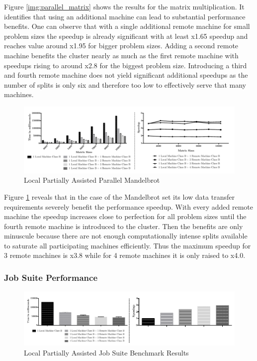 Figure \ref{img:parallel_matrix} shows the results for the matrix multiplication. It identifies that using an additional machine can lead to substantial performance benefits. One can observe that with a single additional remote machine for small problem sizes the speedup is already significant with at least x1.65 speedup and reaches value around x1.95 for bigger problem sizes. Adding a second remote machine benefits the cluster nearly as much as the first remote machine with speedups rising to around x2.8 for the biggest problem size. Introducing a third and fourth remote machine does not yield significant additional speedups as the number of splits is only six and therefore too low to effectively serve that many machines.

\begin{figure}[H]
	
	\includegraphics[width=1.0\textwidth]{images/local_partially_assisted_mandelbrot.pdf}
	\centering
	\caption{Local Partially Assisted Parallel Mandelbrot}
	\label{img:parallel_mandelbrot}
\end{figure}

Figure \ref{img:parallel_mandelbrot} reveals that in the case of the Mandelbrot set its low data transfer requirements severely benefit the performance speedup. With every added remote machine the speedup increases close to perfection for all problem sizes until the fourth remote machine is introduced to the cluster. Then the benefits are only minuscule because there are not enough computationally intense splits available to saturate all participating machines efficiently. Thus the maximum speedup for 3 remote machines is x3.8 while for 4 remote machines it is only raised to x4.0.


\subsubsection*{Job Suite Performance}
\label{job_suite_performance}

\begin{figure}[H]
	
	\includegraphics[width=1.0\textwidth]{images/local_partially_assisted_full_benchmark.pdf}
	\centering
	\caption{Local Partially Assisted Job Suite Benchmark Results}
	\label{img:local_benchmark_results}
\end{figure}

